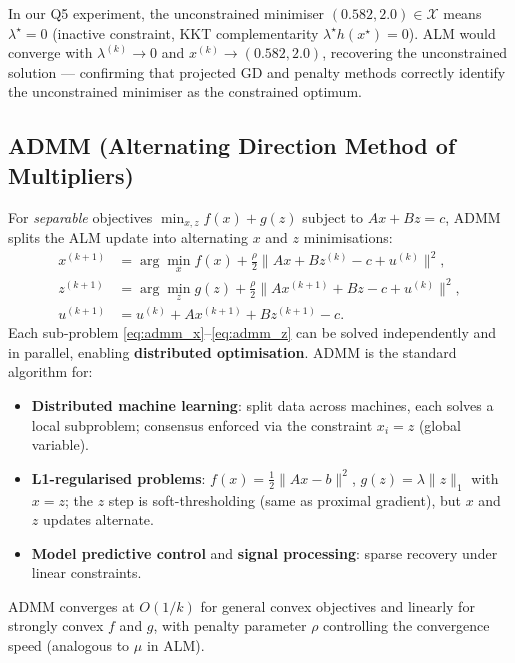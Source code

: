 \documentclass[11pt,a4paper]{article}
\theoremstyle{definition}
\begin{document}
In our Q5 experiment, the unconstrained minimiser $(0.582, 2.0) \in \mathcal{X}$ means $\lambda^{\star} = 0$ (inactive constraint, KKT complementarity $\lambda^{\star} h(x^{\star}) = 0$). ALM would converge with $\lambda^{(k)} \to 0$ and $x^{(k)} \to (0.582, 2.0)$, recovering the unconstrained solution --- confirming that projected GD and penalty methods correctly identify the unconstrained minimiser as the constrained optimum.

\subsection{ADMM (Alternating Direction Method of Multipliers)}

For \emph{separable} objectives $\min_{x, z} f(x) + g(z)$ subject to $Ax + Bz = c$, ADMM splits the ALM update into alternating $x$ and $z$ minimisations:
\begin{align}
x^{(k+1)} &= \arg\min_x f(x) + \frac{\rho}{2}\|Ax + Bz^{(k)} - c + u^{(k)}\|^2, \label{eq:admm_x}\\
z^{(k+1)} &= \arg\min_z g(z) + \frac{\rho}{2}\|Ax^{(k+1)} + Bz - c + u^{(k)}\|^2, \label{eq:admm_z}\\
u^{(k+1)} &= u^{(k)} + Ax^{(k+1)} + Bz^{(k+1)} - c. \label{eq:admm_u}
\end{align}
Each sub-problem \eqref{eq:admm_x}--\eqref{eq:admm_z} can be solved independently and in parallel, enabling \textbf{distributed optimisation}. ADMM is the standard algorithm for:
\begin{itemize}
\item \textbf{Distributed machine learning}: split data across machines, each solves a local subproblem; consensus enforced via the constraint $x_i = z$ (global variable).
\item \textbf{L1-regularised problems}: $f(x) = \frac{1}{2}\|Ax - b\|^2$, $g(z) = \lambda\|z\|_1$ with $x = z$; the $z$ step is soft-thresholding (same as proximal gradient), but $x$ and $z$ updates alternate.
\item \textbf{Model predictive control} and \textbf{signal processing}: sparse recovery under linear constraints.
\end{itemize}
ADMM converges at $O(1/k)$ for general convex objectives and linearly for strongly convex $f$ and $g$, with penalty parameter $\rho$ controlling the convergence speed (analogous to $\mu$ in ALM).
\end{document}
